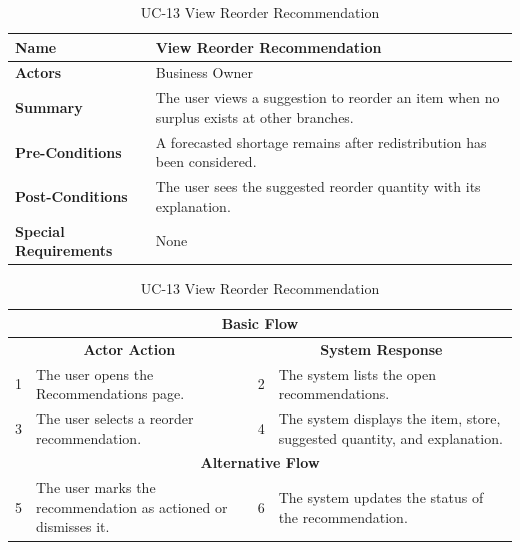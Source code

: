 \documentclass{StockSense}
\begin{document}
\begin{table}[!htbp]
\centering
\caption{UC-13 View Reorder Recommendation}
{\small\linespread{1}\selectfont
\begin{tabular}{|p{}|p{}|}
\hline
\textbf{Name} & View Reorder Recommendation \\ \hline
\textbf{Actors} & Business Owner \\ \hline
\textbf{Summary} & The user views a suggestion to reorder an item when no surplus exists at other branches. \\ \hline
\textbf{Pre-Conditions} & A forecasted shortage remains after redistribution has been considered. \\ \hline
\textbf{Post-Conditions} & The user sees the suggested reorder quantity with its explanation. \\ \hline
\textbf{Special Requirements} & None \\ \hline
\end{tabular}\par\nointerlineskip
\begin{tabular}{|p{}|p{}|p{}|p{}|}
\multicolumn{4}{|c|}{\textbf{Basic Flow}} \\ \hline
\multicolumn{2}{|c|}{\textbf{Actor Action}} & \multicolumn{2}{c|}{\textbf{System Response}} \\ \hline
1 & The user opens the Recommendations page. & 2 & The system lists the open recommendations. \\ \hline
3 & The user selects a reorder recommendation. & 4 & The system displays the item, store, suggested quantity, and explanation. \\ \hline
\multicolumn{4}{|c|}{\textbf{Alternative Flow}} \\ \hline
5 & The user marks the recommendation as actioned or dismisses it. & 6 & The system updates the status of the recommendation. \\ \hline
\end{tabular}\par}
\end{table}
\end{document}
